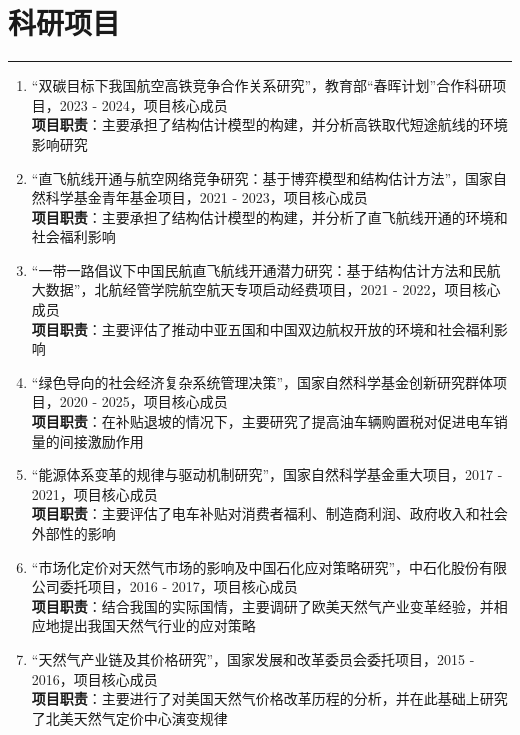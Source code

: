 \documentclass[letterpaper]{article}
\begin{document}
\section*{科研项目}
\hrule
\vspace{0.25cm}
  \begin{enumerate}
    \item “双碳目标下我国航空高铁竞争合作关系研究”，教育部“春晖计划”合作科研项目，2023 - 2024，项目核心成员 \\
    \textbf{项目职责}：主要承担了结构估计模型的构建，并分析高铁取代短途航线的环境影响研究
    \item “直飞航线开通与航空网络竞争研究：基于博弈模型和结构估计方法”，国家自然科学基金青年基金项目，2021 - 2023，项目核心成员 \\
    \textbf{项目职责}：主要承担了结构估计模型的构建，并分析了直飞航线开通的环境和社会福利影响
    \item “一带一路倡议下中国民航直飞航线开通潜力研究：基于结构估计方法和民航大数据”，北航经管学院航空航天专项启动经费项目，2021 - 2022，项目核心成员 \\
    \textbf{项目职责}：主要评估了推动中亚五国和中国双边航权开放的环境和社会福利影响
    \item “绿色导向的社会经济复杂系统管理决策”，国家自然科学基金创新研究群体项目，2020 - 2025，项目核心成员 \\
    \textbf{项目职责}：在补贴退坡的情况下，主要研究了提高油车辆购置税对促进电车销量的间接激励作用
    \item “能源体系变革的规律与驱动机制研究”，国家自然科学基金重大项目，2017 - 2021，项目核心成员 \\
    \textbf{项目职责}：主要评估了电车补贴对消费者福利、制造商利润、政府收入和社会外部性的影响
    \item “市场化定价对天然气市场的影响及中国石化应对策略研究”，中石化股份有限公司委托项目，2016 - 2017，项目核心成员 \\
    \textbf{项目职责}：结合我国的实际国情，主要调研了欧美天然气产业变革经验，并相应地提出我国天然气行业的应对策略
    \item “天然气产业链及其价格研究”，国家发展和改革委员会委托项目，2015 - 2016，项目核心成员 \\
    \textbf{项目职责}：主要进行了对美国天然气价格改革历程的分析，并在此基础上研究了北美天然气定价中心演变规律
  \end{enumerate}
\end{document}
